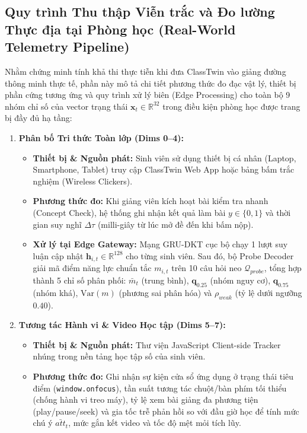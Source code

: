 \subsection{Quy trình Thu thập Viễn trắc và Đo lường Thực địa tại Phòng học (Real-World Telemetry Pipeline)}\label{subsec:real-world-telemetry}
Nhằm chứng minh tính khả thi thực tiễn khi đưa ClassTwin vào giảng đường thông minh thực tế, phần này mô tả chi tiết phương thức đo đạc vật lý, thiết bị phần cứng tương ứng và quy trình xử lý biên (Edge Processing) cho toàn bộ 9 nhóm chỉ số của vector trạng thái $\mathbf{x}_t \in \mathbb{R}^{32}$ trong điều kiện phòng học được trang bị đầy đủ hạ tầng:

\begin{enumerate}[label=\textbf{Nhóm \arabic*.}]
  \item \textbf{Phân bố Tri thức Toàn lớp (Dims 0--4):}
  \begin{itemize}
    \item \textbf{Thiết bị \& Nguồn phát:} Sinh viên sử dụng thiết bị cá nhân (Laptop, Smartphone, Tablet) truy cập ClassTwin Web App hoặc bảng bấm trắc nghiệm (Wireless Clickers).
    \item \textbf{Phương thức đo:} Khi giảng viên kích hoạt bài kiểm tra nhanh (Concept Check), hệ thống ghi nhận kết quả làm bài $y \in \{0, 1\}$ và thời gian suy nghĩ $\Delta\tau$ (milli-giây từ lúc mở đề đến khi bấm nộp).
    \item \textbf{Xử lý tại Edge Gateway:} Mạng GRU-DKT cục bộ chạy 1 lượt suy luận cập nhật $\mathbf{h}_{i, t} \in \mathbb{R}^{128}$ cho từng sinh viên. Sau đó, bộ Probe Decoder giải mã điểm năng lực chuẩn tắc $m_{i, t}$ trên 10 câu hỏi neo $\mathcal{Q}_{probe}$, tổng hợp thành 5 chỉ số phân phối: $\bar{m}_t$ (trung bình), $\mathbf{q}_{0.25}$ (nhóm nguy cơ), $\mathbf{q}_{0.75}$ (nhóm khá), $\text{Var}(m)$ (phương sai phân hóa) và $\rho_{weak}$ (tỷ lệ dưới ngưỡng $0.40$).
  \end{itemize}

  \item \textbf{Tương tác Hành vi \& Video Học tập (Dims 5--7):}
  \begin{itemize}
    \item \textbf{Thiết bị \& Nguồn phát:} Thư viện JavaScript Client-side Tracker nhúng trong nền tảng học tập số của sinh viên.
    \item \textbf{Phương thức đo:} Ghi nhận sự kiện cửa sổ ứng dụng ở trạng thái tiêu điểm (\texttt{window.onfocus}), tần suất tương tác chuột/bàn phím tối thiểu (chống hành vi treo máy), tỷ lệ xem bài giảng đa phương tiện (play/pause/seek) và gia tốc trễ phản hồi so với đầu giờ học để tính mức chú ý $\bar{att}_t$, mức gắn kết video và tốc độ mệt mỏi tích lũy.
  \end{itemize}


\end{enumerate}
